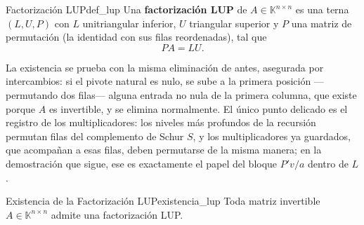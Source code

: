 \documentclass[11pt, a4paper]{article}
\begin{document}
\begin{definicion}{Factorización LUP}{def_lup}
Una \textbf{factorización LUP} de $A \in \mathbb{K}^{n \times n}$ es una terna $(L, U, P)$ con $L$ unitriangular inferior, $U$ triangular superior y $P$ una matriz de permutación (la identidad con sus filas reordenadas), tal que
\[
P A = L U.
\]
\end{definicion}

La existencia se prueba con la misma eliminación de antes, asegurada por intercambios: si el pivote natural es nulo, se sube a la primera posición —permutando dos filas— alguna entrada no nula de la primera columna, que existe porque $A$ es invertible, y se elimina normalmente. El único punto delicado es el registro de los multiplicadores: los niveles más profundos de la recursión permutan filas del complemento de Schur $S$, y los multiplicadores ya guardados, que acompañan a esas filas, deben permutarse de la misma manera; en la demostración que sigue, ese es exactamente el papel del bloque $P'v/a$ dentro de $L$.

\begin{teorema}{Existencia de la Factorización LUP}{existencia_lup}
Toda matriz invertible $A \in \mathbb{K}^{n \times n}$ admite una factorización LUP.
\end{teorema}
\end{document}
